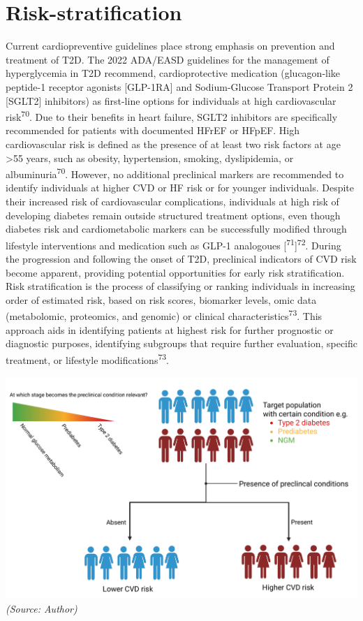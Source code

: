 \documentclass[
  letterpaper,
  headsepline=true,
  open=any]{scrbook}
\begin{document}
\hypertarget{risk-stratification}{%
\section{Risk-stratification}\label{risk-stratification}}

Current cardiopreventive guidelines place strong emphasis on prevention
and treatment of T2D. The 2022 ADA/EASD guidelines for the management of
hyperglycemia in T2D recommend, cardioprotective medication
(glucagon-like peptide-1 receptor agonists {[}GLP-1RA{]} and
Sodium-Glucose Transport Protein 2 {[}SGLT2{]} inhibitors) as first-line
options for individuals at high cardiovascular risk\textsuperscript{70}.
Due to their benefits in heart failure, SGLT2 inhibitors are
specifically recommended for patients with documented HFrEF or HFpEF.
High cardiovascular risk is defined as the presence of at least two risk
factors at age \textgreater55 years, such as obesity, hypertension,
smoking, dyslipidemia, or albuminuria\textsuperscript{70}. However, no
additional preclinical markers are recommended to identify individuals
at higher CVD or HF risk or for younger individuals. Despite their
increased risk of cardiovascular complications, individuals at high risk
of developing diabetes remain outside structured treatment options, even
though diabetes risk and cardiometabolic markers can be successfully
modified through lifestyle interventions and medication such as GLP-1
analogoues {[}\textsuperscript{71}{]}\textsuperscript{72}. During the
progression and following the onset of T2D, preclinical indicators of
CVD risk become apparent, providing potential opportunities for early
risk stratification. Risk stratification is the process of classifying
or ranking individuals in increasing order of estimated risk, based on
risk scores, biomarker levels, omic data (metabolomic, proteomics, and
genomic) or clinical characteristics\textsuperscript{73}. This approach
aids in identifying patients at highest risk for further prognostic or
diagnostic purposes, identifying subgroups that require further
evaluation, specific treatment, or lifestyle
modifications\textsuperscript{73}.

\includegraphics{images/risk_stratification.pdf} \emph{(Source: Author)}
\end{document}
